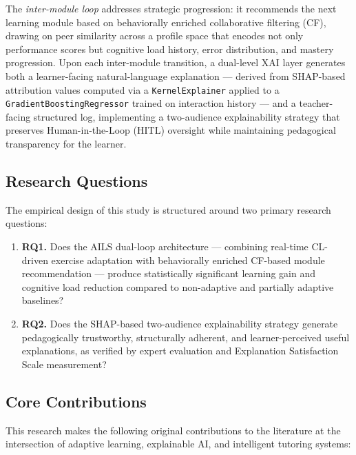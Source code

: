 \documentclass[ASNA,twocolumn]{USG} %
\begin{document}
The \emph{inter-module loop} addresses strategic progression:
it recommends the next learning module based on behaviorally
enriched collaborative filtering (CF), drawing on peer
similarity across a profile space that encodes not only
performance scores but cognitive load history, error
distribution, and mastery progression.
Upon each inter-module transition, a dual-level XAI layer
generates both a learner-facing natural-language explanation
--- derived from SHAP-based attribution values computed via
a \texttt{KernelExplainer} applied to a
\texttt{GradientBoostingRegressor} trained on interaction
history --- and a teacher-facing structured log, implementing
a two-audience explainability strategy that preserves Human-in-the-Loop
(HITL) oversight while maintaining pedagogical transparency
for the learner.

\subsection{Research Questions}
\label{sec:intro_rq}

The empirical design of this study is structured around two
primary research questions:

\begin{enumerate}[(1)]
  \item \textbf{RQ1.}
        Does the AILS dual-loop architecture --- combining
        real-time CL-driven exercise adaptation with
        behaviorally enriched CF-based module recommendation
        --- produce statistically significant learning gain
        and cognitive load reduction compared to non-adaptive
        and partially adaptive baselines?

  \item \textbf{RQ2.}
        Does the SHAP-based two-audience explainability
        strategy generate pedagogically trustworthy,
        structurally adherent, and learner-perceived useful
        explanations, as verified by expert evaluation and
        Explanation Satisfaction Scale measurement?
\end{enumerate}

\subsection{Core Contributions}
\label{sec:intro_contributions}

This research makes the following original contributions to
the literature at the intersection of adaptive learning,
explainable AI, and intelligent tutoring systems:
\end{document}
